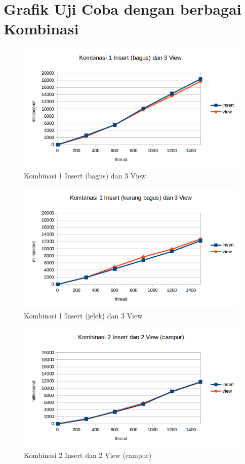 \documentclass{ta-its}
\begin{document}
	\chapter{Grafik Uji Coba dengan berbagai Kombinasi}
		\begin{figure}[h] %
			\centering
			\includegraphics[width=0.85\linewidth]{contoh_img/hasil/1-3-bagus}
			\caption{Kombinasi 1 Insert (bagus) dan 3 View}
			\label{gambar1-3bagus}
		\end{figure}
		
		\begin{figure}[h] %
			\centering
			\includegraphics[width=0.85\linewidth]{contoh_img/hasil/1-3-jelek}
			\caption{Kombinasi 1 Insert (jelek) dan 3 View}
			\label{gambar1-3jelek}
		\end{figure}
		
		\begin{figure}[h] %
			\centering
			\includegraphics[width=0.85\linewidth]{contoh_img/hasil/2-2-campur}
			\caption{Kombinasi 2 Insert dan 2 View (campur)}
			\label{gambar2-2campur}
		\end{figure}
		
\end{document}
